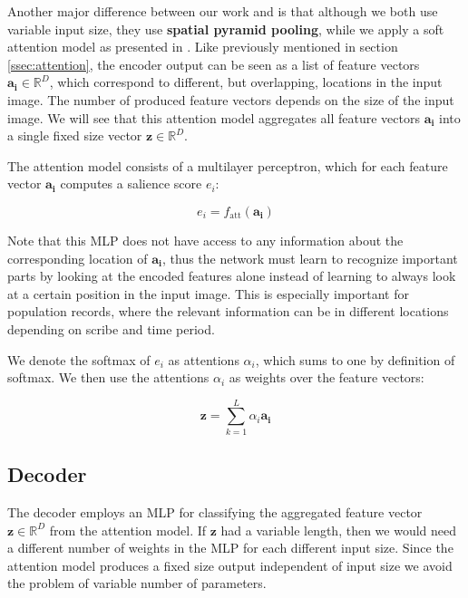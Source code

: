 Another major difference between our work and \cite{FornesCnnCategorization} is that although we both use variable input size, they use \textbf{spatial pyramid pooling}, while we apply a soft attention model as presented in \cite{AttendAndTell}.
Like previously mentioned in section \ref{ssec:attention}, the encoder output can be seen as a list of feature vectors $\mathbf{a_i} \in \mathbb{R}^D$, which correspond to different, but overlapping, locations in the input image. The number of produced feature vectors depends on the size of the input image. We will see that this attention model aggregates all feature vectors $\mathbf{a_i}$ into a single fixed size vector $\mathbf{z} \in \mathbb{R}^D$.

The attention model consists of a multilayer perceptron, which for each feature vector $\mathbf{a_i}$ computes a salience score $e_i$:

\[
e_i = f_\text{att}(\mathbf{a_i})
\]

Note that this MLP does not have access to any information about the corresponding location of $\mathbf{a_i}$, thus the network must learn to recognize important parts by looking at the encoded features alone instead of learning to always look at a certain position in the input image. This is especially important for population records, where the relevant information can be in different locations depending on scribe and time period.


We denote the softmax of $e_i$ as attentions $\alpha_i$, which sums to one by definition of softmax.
We then use the attentions $\alpha_i$ as weights over the feature vectors:

\[
\mathbf{z} = \sum_{k=1}^L \alpha_i \mathbf{a_i}
\]



\subsection{Decoder}

The decoder employs an MLP for classifying the aggregated feature vector $\mathbf{z} \in \mathbb{R}^D$ from the attention model.
If $\mathbf{z}$ had a variable length, then we would need a different number of weights in the MLP for each different input size. Since the attention model produces a fixed size output independent of input size we avoid the problem of variable number of parameters.

